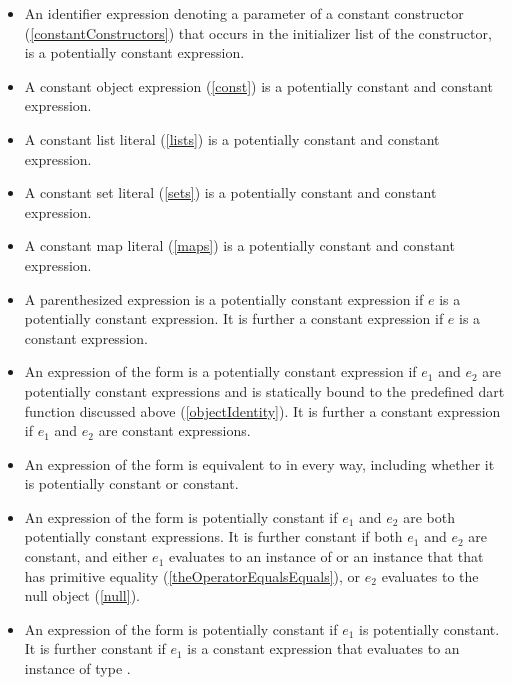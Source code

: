 \documentclass[makeidx]{article}
\begin{document}
{\begin{itemize}
\item
  An identifier expression denoting a parameter of a constant constructor
  (\ref{constantConstructors})
  that occurs in the initializer list of the constructor,
  is a potentially constant expression.

\item
  A constant object expression (\ref{const})
  is a potentially constant and constant expression.

\item
  A constant list literal (\ref{lists})
  is a potentially constant and constant expression.

\item
  A constant set literal (\ref{sets})
  is a potentially constant and constant expression.

\item
  A constant map literal (\ref{maps})
  is a potentially constant and constant expression.

\item
  A parenthesized expression  is
  a potentially constant expression
  if $e$ is a potentially constant expression.
  It is further a constant expression if $e$ is a constant expression.

\item
  An expression of the form  is
  a potentially constant expression
  if $e_1$ and $e_2$ are potentially constant expressions
  and  is statically bound to
  the predefined dart function  discussed above
  (\ref{objectIdentity}).
  It is further a constant expression
  if $e_1$ and $e_2$ are constant expressions.

\item
  An expression of the form  is
  equivalent to  in every way,
  including whether it is potentially constant or constant.

\item
  An expression of the form  is potentially constant
  if $e_1$ and $e_2$ are both potentially constant expressions.
  It is further constant if both $e_1$ and $e_2$ are constant, and
  either $e_1$ evaluates to an instance of 
  or an instance that that has primitive equality
  (\ref{theOperatorEqualsEquals}),
  or $e_2$ evaluates to the null object
  (\ref{null}).

\item
  An expression of the form  is potentially constant
  if $e_1$ is potentially constant.
  It is further constant if $e_1$ is a constant expression that evaluates to
  an instance of type .


\end{itemize}}
\end{document}
